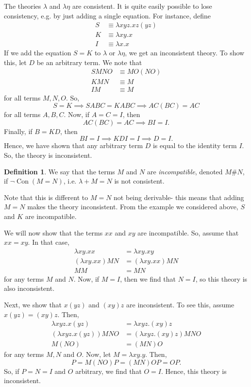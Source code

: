\documentclass[a4paper, openany]{memoir}
\theoremstyle{definition}
\newtheorem{definition}[proposition]{Definition}
\begin{document}
    The theories $\lambda$ and $\lambda \eta$ are consistent. It is quite easily possible to lose consistency, e.g. by just adding a single equation. For instance, define
    \begin{align*}
        S &\equiv \lambda xyz.xz(yz) \\
        K &\equiv \lambda xy.x \\
        I &\equiv \lambda x.x
    \end{align*}
    If we add the equation $S = K$ to $\lambda$ or $\lambda \eta$, we get an inconsistent theory. To show this, let $D$ be an arbitrary term. We note that
    \begin{align*}
        SMNO &\equiv MO(NO) \\
        KMN &\equiv M \\
        IM &\equiv M
    \end{align*}
    for all terms $M, N, O$. So,
    \[S = K \implies SABC = KABC \implies AC(BC) = AC\]
    for all terms $A, B, C$. Now, if $A = C = I$, then
    \[AC(BC) = AC \implies BI = I.\]
    Finally, if $B = KD$, then
    \[BI = I \implies KDI = I \implies D = I.\]
    Hence, we have shown that any arbitrary term $D$ is equal to the identity term $I$. So, the theory is inconsistent.

    \begin{definition}
        We say that the terms $M$ and $N$ are \emph{incompatible}, denoted $M\#N$, if $\lnot \operatorname{Con}(M = N)$, i.e. $\lambda + M = N$ is not consistent.
    \end{definition}
    \noindent Note that this is different to $M = N$ not being derivable- this means that adding $M = N$ makes the theory inconsistent. From the example we considered above, $S$ and $K$ are incompatible.

    We will now show that the terms $xx$ and $xy$ are incompatible. So, assume that $xx = xy$. In that case,
    \begin{align*}
        \lambda xy.xx &= \lambda xy.xy \\
        (\lambda xy.xx)MN &= (\lambda xy.xx)MN \\
        MM &= MN
    \end{align*}
    for any terms $M$ and $N$. Now, if $M = I$, then we find that $N = I$, so this theory is also inconsistent.

    Next, we show that $x(yz)$ and $(xy)z$ are inconsistent. To see this, assume $x(yz) = (xy)z$. Then,
    \begin{align*}
        \lambda xyz.x(yz) &= \lambda xyz.(xy)z \\
        (\lambda xyz.x(yz)) MNO &= (\lambda xyz.(xy)z) MNO \\
        M(NO) &= (MN)O
    \end{align*}
    for any terms $M, N$ and $O$. Now, let $M = \lambda xy.y$. Then,
    \[P = M(NO)P = (MN)OP = OP.\]
    So, if $P = N = I$ and $O$ arbitrary, we find that $O = I$. Hence, this theory is inconsistent.
\end{document}
